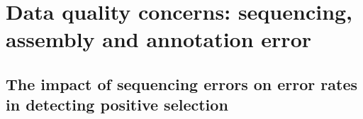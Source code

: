 
\section{Data quality concerns: sequencing, assembly and annotation error}

\subsection{The impact of sequencing errors on error rates in detecting positive selection}

